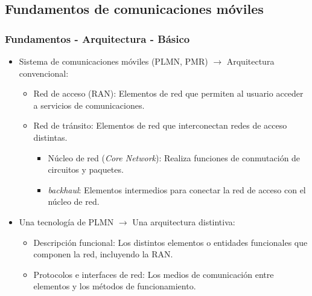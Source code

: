 \documentclass{beamer}
\begin{document}
\subsection{Fundamentos de comunicaciones móviles}

\begin{frame}
\frametitle{Fundamentos - Arquitectura - Básico}

\begin{itemize}
\item {
	Sistema de comunicaciones móviles (PLMN, PMR) $\rightarrow$ Arquitectura convencional:
	\begin{itemize}
	\item Red de acceso (RAN): Elementos de red que permiten al usuario acceder a servicios de comunicaciones.
	\item {
		Red de tránsito: Elementos de red que interconectan redes de acceso distintas.
		\begin{itemize}
		\item Núcleo de red (\textit{Core Network}): Realiza funciones de conmutación de circuitos y paquetes.
		\item \textit{backhaul}: Elementos intermedios para conectar la red de acceso con el núcleo de red.
		\end{itemize}
	}
	\end{itemize}
}
\item {
	Una tecnología de PLMN $\rightarrow$ Una arquitectura distintiva:
	\begin{itemize}
	\item Descripción funcional: Los distintos elementos o entidades funcionales que componen la red, incluyendo la RAN.
	\item Protocolos e interfaces de red: Los medios de comunicación entre elementos y los métodos de funcionamiento.
	\end{itemize}
}
\end{itemize}
\end{frame}
\end{document}
